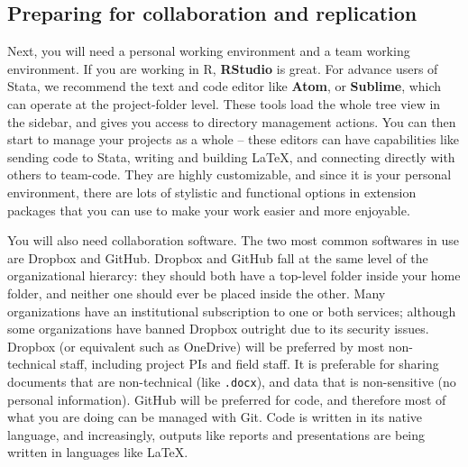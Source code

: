 \subsection{Preparing for collaboration and replication}

Next, you will need a personal working environment and a team working environment.
If you are working in R, \textbf{RStudio} is great.
For advance users of Stata, we recommend the text and code editor like \textbf{Atom},
or \textbf{Sublime},
which can operate at the project-folder level.
These tools load the whole tree view in the sidebar,
and gives you access to directory management actions.
You can then start to manage your projects as a whole --
these editors can have capabilities like sending code to Stata,
writing and building \LaTeX,
and connecting directly with others to team-code.
They are highly customizable, and since it is your personal environment,
there are lots of stylistic and functional options in extension packages
that you can use to make your work easier and more enjoyable.

You will also need collaboration software.
The two most common softwares in use are Dropbox and GitHub.
Dropbox and GitHub fall at the same level of the organizational hierarcy:
they should both have a top-level folder inside your home folder,
and neither one should ever be placed inside the other.
Many organizations have an institutional subscription to one or both services;
although some organizations have banned Dropbox outright due to its security issues.
Dropbox (or equivalent such as OneDrive) will be preferred by most non-technical staff,
including project PIs and field staff.
It is preferable for sharing documents that are non-technical (like \texttt{.docx}),
and data that is non-sensitive (no personal information).
GitHub will be preferred for code,
and therefore most of what you are doing can be managed with Git.
Code is written in its native language,
and increasingly, outputs like reports
and presentations
are being written in languages like \LaTeX.

